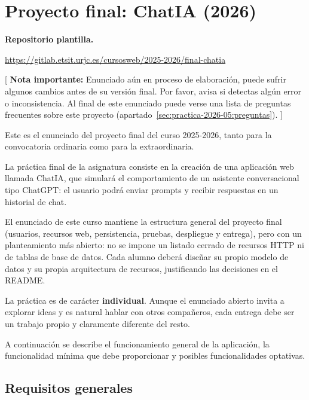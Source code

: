 \section{Proyecto final: ChatIA (2026)}
\label{practica-final-2026-05}

\textbf{Repositorio plantilla.}

\url{https://gitlab.etsit.urjc.es/cursosweb/2025-2026/final-chatia}

[ \textbf{Nota importante:} Enunciado aún en proceso de elaboración, puede sufrir algunos cambios antes de su versión final. Por favor, avisa si detectas algún error o inconsistencia. Al final de este enunciado puede verse una lista de preguntas frecuentes sobre este proyecto (apartado~\ref{sec:practica-2026-05:preguntas}). ]


Este es el enunciado del proyecto final del curso 2025-2026, tanto para la convocatoria ordinaria como para la extraordinaria.

La práctica final de la asignatura consiste en la creación de una aplicación web llamada ChatIA, que simulará el comportamiento de un asistente conversacional tipo ChatGPT: el usuario podrá enviar prompts y recibir respuestas en un historial de chat.

El enunciado de este curso mantiene la estructura general del proyecto final (usuarios, recursos web, persistencia, pruebas, despliegue y entrega), pero con un planteamiento más abierto: no se impone un listado cerrado de recursos HTTP ni de tablas de base de datos. Cada alumno deberá diseñar su propio modelo de datos y su propia arquitectura de recursos, justificando las decisiones en el README.

La práctica es de carácter \textbf{individual}. Aunque el enunciado abierto invita a explorar ideas y es natural hablar con otros compañeros, cada entrega debe ser un trabajo propio y claramente diferente del resto.

A continuación se describe el funcionamiento general de la aplicación, la funcionalidad mínima que debe proporcionar y posibles funcionalidades optativas.

\subsection{Requisitos generales}

